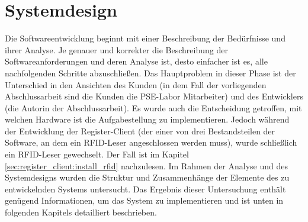 \chapter{Systemdesign}
\label{sec:design}
Die Softwareentwicklung beginnt mit einer Beschreibung der Bedürfnisse und ihrer Analyse. Je genauer und korrekter die Beschreibung der Softwareanforderungen und deren Analyse ist, desto einfacher ist es, alle nachfolgenden Schritte abzuschließen. Das Hauptproblem in dieser Phase ist der Unterschied in den Ansichten des Kunden (in dem Fall der vorliegenden Abschlussarbeit sind die Kunden die PSE-Labor Mitarbeiter) und des Entwicklers (die Autorin der Abschlussarbeit). Es wurde auch die Entscheidung getroffen, mit welchen Hardware ist die Aufgabestellung zu implementieren. Jedoch während der Entwicklung der Register-Client (der einer von drei Bestandsteilen der Software, an dem ein RFID-Leser angeschlossen werden muss), wurde schließlich ein RFID-Leser gewechselt. Der Fall ist im Kapitel \ref{sec:register_client:install_rfid} nachzulesen. Im Rahmen der Analyse und des Systemdesigns wurden die Struktur und Zusammenhänge der Elemente des zu entwickelnden Systems untersucht. Das Ergebnis dieser Untersuchung enthält genügend Informationen, um das System zu implementieren und ist unten in folgenden Kapitels detailliert beschrieben. 

